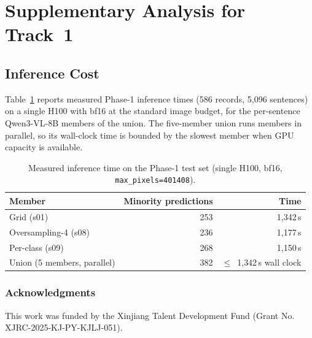 \documentclass[runningheads]{llncs}
\begin{document}
\appendix
\section{Supplementary Analysis for Track~1}
\label{app:t1}

\subsection{Inference Cost}
Table~\ref{tab:t1-cost} reports measured Phase-1 inference times (586 records, 5{,}096 sentences) on a single H100 with bf16 at the standard image budget, for the per-sentence Qwen3-VL-8B members of the union. The five-member union runs members in parallel, so its wall-clock time is bounded by the slowest member when GPU capacity is available.

\begin{table}[H]
\centering
\caption{Measured inference time on the Phase-1 test set (single H100, bf16, \texttt{max\_pixels=401408}).}
\label{tab:t1-cost}
\small
\begin{tabular}{lrr}
\toprule
Member & Minority predictions & Time\\
\midrule
Grid (s01) & 253 & 1{,}342\,s\\
Oversampling-4 (s08) & 236 & 1{,}177\,s\\
Per-class (s09) & 268 & 1{,}150\,s\\
\midrule
Union (5 members, parallel) & 382 & $\leq$~1{,}342\,s wall clock\\
\bottomrule
\end{tabular}
\end{table}

\FloatBarrier

\subsubsection*{Acknowledgments}
This work was funded by the Xinjiang Talent Development Fund (Grant No. XJRC-2025-KJ-PY-KJLJ-051).



\end{document}
